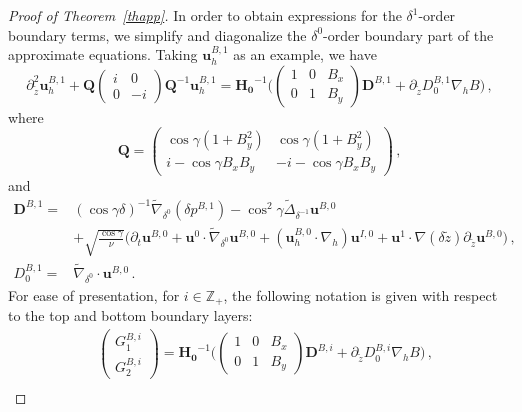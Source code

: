 \documentclass[pdflatex,sn-mathphys-num]{sn-jnl}%
\theoremstyle{thmstyleone}%
\theoremstyle{thmstyletwo}%
\theoremstyle{thmstylethree}%
\theoremstyle{thmstyletwo}
\begin{document}
\begin{proof}[Proof of Theorem~{\upshape\ref{thapp}}]
In order to obtain expressions for the $\delta^{1}$-order boundary terms, we simplify and diagonalize the $\delta^{0}$-order boundary part of the approximate equations. Taking $\boldsymbol{u}_h^{B,1}$ as an example, we have
\begin{equation}\label{2.23}
	\partial_{\tilde z}^2 \boldsymbol u_h^{B,1}+
	\boldsymbol{Q}\begin{pmatrix}
		i&0\\
		0&-i
	\end{pmatrix}\boldsymbol{Q}^{-1}\boldsymbol u_h^{B,1}=\boldsymbol{H_0}^{-1}
	\bigg(\begin{pmatrix}
		1&0&B_x\\
		0&1&B_y	
	\end{pmatrix}\boldsymbol{D}^{B,1}+\partial_{\tilde{z}} D^{B,1}_0\nabla_h B\bigg)\,,
\end{equation}
where
\begin{equation*}
	\boldsymbol{Q}=\begin{pmatrix}
		\cos\gamma(1+B_y^2)
		&\cos\gamma(1+B_y^2)\\
		i-\cos\gamma B_xB_y
		&-i-\cos\gamma B_xB_y
	\end{pmatrix}\,,
\end{equation*}
and
\begin{align*}
	\boldsymbol{D}^{B,1}
	=&(\cos\gamma\delta)^{-1}\tilde{\nabla}_{\delta^0}(\delta p^{B,1})
	-\cos^2\gamma\tilde{\Delta}_{\delta^{-1}}\boldsymbol u^{B,0}
	\\
	&
	+\sqrt{\tfrac{\cos\gamma}{\nu}}
	\Big(
	\partial_t\boldsymbol u^{B,0}+\boldsymbol{u}^{0}\cdot\tilde{\nabla}_{\delta^0}\boldsymbol{u}^{B,0}
	+(\boldsymbol{u}_h^{B,0}\cdot\nabla_h)\boldsymbol{u}^{I,0}+\boldsymbol{u}^{1}\cdot\nabla(\delta\tilde{z})\partial_{\tilde{z}}\boldsymbol{u}^{B,0}
	\Big)\,,\\
	D^{B,1}_0=
	&\tilde{\nabla}_{\delta^0}\cdot\boldsymbol u^{B,0}\,.
\end{align*}
For ease of presentation, for $i\in\mathbb{Z_+}$, the following notation is given with respect to the top and bottom boundary layers:
\begin{align*}
	&\begin{pmatrix}
		G^{B,i}_1\\
		G^{B,i}_2
	\end{pmatrix}=\boldsymbol{H_0}^{-1}
	\bigg(\begin{pmatrix}
		1&0&B_x\\
		0&1&B_y	
	\end{pmatrix}\boldsymbol{D}^{B,i}+\partial_{\tilde{z}} D^{B,i}_0\nabla_h B\bigg)\,,\\

\end{align*}
\end{proof}
\end{document}
